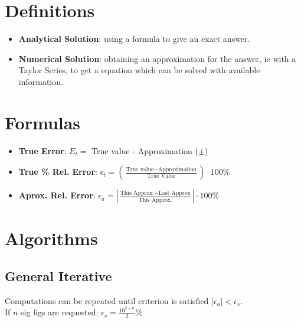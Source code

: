 \documentclass[fontsize=5pt]{scrartcl}
\begin{document}
\begin{multicols}{3}
  \section{Definitions}
    \begin{itemize}
      \item \textbf{Analytical Solution}: using a formula to give an exact answer.
      \item \textbf{Numerical Solution}: obtaining an approximation for the answer, 
            ie with a Taylor Series, to get a equation which can be solved with available
            information.
    \end{itemize}

  \section{Formulas}
      \begin{itemize}
        \item \textbf{True Error}: $E_t =$ True value - Approximation ($\pm$)
        \item \textbf{True \% Rel. Error}: $\epsilon_t = (\frac{\text{True value} - \text{Approximation}}{\text{True Value}})\cdot100\%$
        \item \textbf{Aprox. Rel. Error}: $\epsilon_a =  |\frac{\text{This Approx.} - \text{Last Approx}}{\text{This Approx.}}|\cdot100\%$
      \end{itemize}
      
  \section{Algorithms}
    \subsection{General Iterative}
      Computations can be repeated until criterion is satisfied $|\epsilon_a| < \epsilon_s$. \\
      If $n$ sig figs are requested: $\epsilon_s = \frac{10^{2-n}}{2}\%$ \\

\end{multicols}
\end{document}
